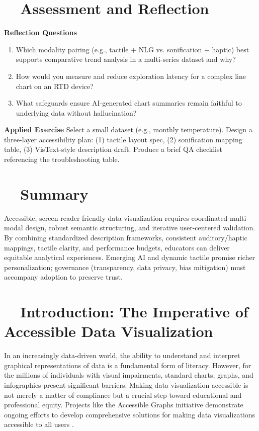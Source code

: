 \section{~~Assessment and Reflection}\label{ch13:sec:assessment-reflection}
\textbf{Reflection Questions}
\begin{enumerate}
	\item Which modality pairing (e.g., tactile + NLG vs. sonification + haptic) best supports comparative trend analysis in a multi-series dataset and why?
	\item How would you measure and reduce exploration latency for a complex line chart on an RTD device?
	\item What safeguards ensure AI-generated chart summaries remain faithful to underlying data without hallucination?
\end{enumerate}
\textbf{Applied Exercise} Select a small dataset (e.g., monthly temperature). Design a three-layer accessibility plan: (1) tactile layout spec, (2) sonification mapping table, (3) VisText-style description draft. Produce a brief QA checklist referencing the troubleshooting table.

\section{~~Summary}\label{ch13:sec:summary}
Accessible, screen reader friendly data visualization requires coordinated multi-modal design, robust semantic structuring, and iterative user-centered validation. By combining standardized description frameworks, consistent auditory/haptic mappings, tactile clarity, and performance budgets, educators can deliver equitable analytical experiences. Emerging AI and dynamic tactile  promise richer personalization; governance (transparency, data privacy, bias mitigation) must accompany adoption to preserve trust.

\section{~~Introduction: The Imperative of Accessible Data Visualization}\label{ch13:sec:introduction}
In an increasingly data-driven world, the ability to understand and interpret graphical representations of data is a fundamental form of literacy. However, for the millions of individuals with visual impairments, standard charts, graphs, and infographics present significant barriers. Making data visualization accessible is not merely a matter of compliance but a crucial step toward educational and professional equity. Projects like the Accessible Graphs initiative demonstrate ongoing efforts to develop comprehensive solutions for making data visualizations accessible to all users \supercite{AccessibleGraphs, AccessVizWorkshop}.

